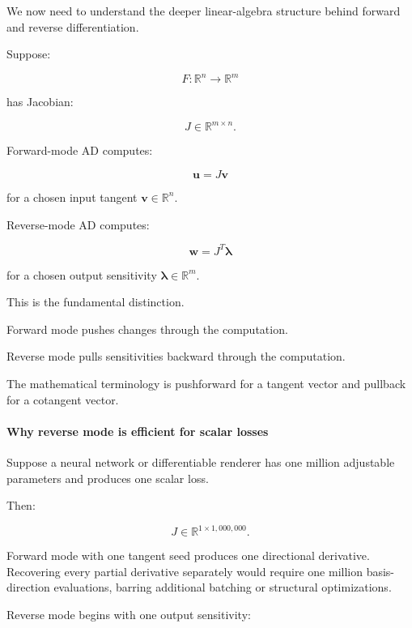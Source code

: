 \hypertarget{02-foundations-ii-ch022-advanced-ad-jacobian-vector-products-versus-vector-jacobian-products}{}

We now need to understand the deeper linear-algebra structure behind forward and reverse differentiation.

Suppose:

\[
F:\mathbb R^n\rightarrow\mathbb R^m
\]

has Jacobian:

\[
J\in\mathbb R^{m\times n}.
\]

Forward-mode AD computes:

\[
\boxed{\mathbf u=J\mathbf v}
\]

for a chosen input tangent \(\mathbf v\in\mathbb R^n\).

Reverse-mode AD computes:

\[
\boxed{\mathbf w=J^T\boldsymbol\lambda}
\]

for a chosen output sensitivity \(\boldsymbol\lambda\in\mathbb R^m\).

This is the fundamental distinction.

Forward mode pushes changes through the computation.

Reverse mode pulls sensitivities backward through the computation.

The mathematical terminology is pushforward for a tangent vector and pullback for a cotangent vector.

\paragraph{Why reverse mode is efficient for scalar losses}\label{02-foundations-ii-ch022-why-reverse-mode-is-efficient-for-scalar-losses}

\hypertarget{02-foundations-ii-ch022-why-reverse-mode-is-efficient-for-scalar-losses}{}

Suppose a neural network or differentiable renderer has one million adjustable parameters and produces one scalar loss.

Then:

\[
J\in\mathbb R^{1\times1{,}000{,}000}.
\]

Forward mode with one tangent seed produces one directional derivative. Recovering every partial derivative separately would require one million basis-direction evaluations, barring additional batching or structural optimizations.

Reverse mode begins with one output sensitivity:

